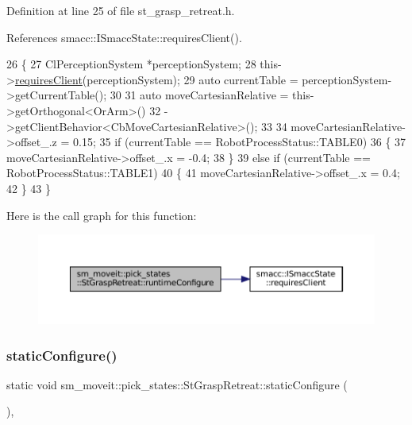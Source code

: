 Definition at line 25 of file st\+\_\+grasp\+\_\+retreat.\+h.



References smacc\+::\+I\+Smacc\+State\+::requires\+Client().


\begin{DoxyCode}
26     \{
27         ClPerceptionSystem *perceptionSystem;
28         this->\hyperlink{classsmacc_1_1ISmaccState_a7f95c9f0a6ea2d6f18d1aec0519de4ac}{requiresClient}(perceptionSystem);
29         \textcolor{keyword}{auto} currentTable = perceptionSystem->getCurrentTable();
30 
31         \textcolor{keyword}{auto} moveCartesianRelative = this->getOrthogonal<OrArm>()
32                                          ->getClientBehavior<CbMoveCartesianRelative>();
33 
34         moveCartesianRelative->offset\_.z = 0.15;
35         \textcolor{keywordflow}{if} (currentTable == RobotProcessStatus::TABLE0)
36         \{
37             moveCartesianRelative->offset\_.x = -0.4;
38         \}
39         \textcolor{keywordflow}{else} \textcolor{keywordflow}{if} (currentTable == RobotProcessStatus::TABLE1)
40         \{
41             moveCartesianRelative->offset\_.x = 0.4;
42         \}
43     \}
\end{DoxyCode}
Here is the call graph for this function\+:
\nopagebreak
\begin{figure}[H]
\begin{center}
\leavevmode
\includegraphics[width=350pt]{structsm__moveit_1_1pick__states_1_1StGraspRetreat_a1a712867a1888f96a82f19d6ccfb2a76_cgraph}
\end{center}
\end{figure}
\mbox{\label{structsm__moveit_1_1pick__states_1_1StGraspRetreat_ae80fb9ae04a037851deaa7df277dcfe8}} 
\subsubsection{\texorpdfstring{static\+Configure()}{staticConfigure()}}
{\footnotesize\ttfamily static void sm\+\_\+moveit\+::pick\+\_\+states\+::\+St\+Grasp\+Retreat\+::static\+Configure (\begin{DoxyParamCaption}{ }\end{DoxyParamCaption})\hspace{0.3cm}{\ttfamily [inline]}, {\ttfamily [static]}}



